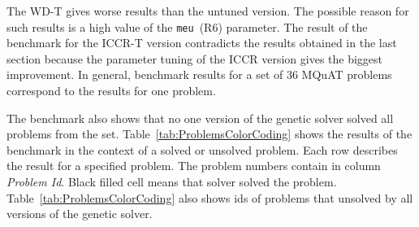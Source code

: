 The WD-T gives worse results than the untuned version. The possible reason for such results is a high value of the \texttt{meu}~(R6) parameter. The result of the benchmark for the ICCR-T version contradicts the results obtained in the last section because the parameter tuning of the ICCR version gives the biggest improvement. In general, benchmark results for a set of 36 MQuAT problems correspond to the results for one problem.

The benchmark also shows that no one version of the genetic solver solved all problems from the set. Table~\ref{tab:ProblemsColorCoding} shows the results of the benchmark in the context of a solved or unsolved problem. Each row describes the result for a specified problem. The problem numbers contain in column \textit{Problem Id}. Black filled cell means that solver solved the problem. Table~\ref{tab:ProblemsColorCoding} also shows ids of problems that unsolved by all versions of the genetic solver.

